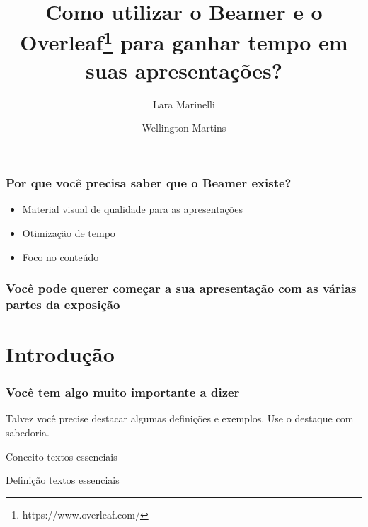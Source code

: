 \documentclass{beamer} %
\author[Lara, Wellington] %
{Lara Marinelli \and Wellington Martins}
\title[PPA Day]{Como utilizar o Beamer e o Overleaf\footnote{https://www.overleaf.com/} para ganhar tempo em suas apresenta\c{c}\~{o}es?}
\institute[VFU] %
{
  \inst{1}%
  Faculty of Physics\\
  Very Famous University
  \and
  \inst{2}%
  Faculty of Chemistry\\
  Very Famous University
}
\begin{document}

\frame{\titlepage}

\begin{frame}
\frametitle{Por que você precisa saber que o Beamer existe?}
\begin{itemize}
    \item Material visual de qualidade para as apresentações
    \item Otimização de tempo
    \item Foco no conteúdo
\end{itemize}
\end{frame}


\begin{frame}
\frametitle{Você pode querer começar a sua apresentação com as várias partes da exposição}
\tableofcontents
\end{frame}

\section{Introdução}
\begin{frame}
\frametitle{Você tem algo muito importante a dizer}

Talvez você precise \alert{destacar} algumas definições e exemplos. Use o destaque com sabedoria.

\begin{block}{Conceito}
textos essenciais
\end{block}

\begin{alertblock}{Definição}
textos essenciais
\end{alertblock}

\end{frame}
\end{document}

